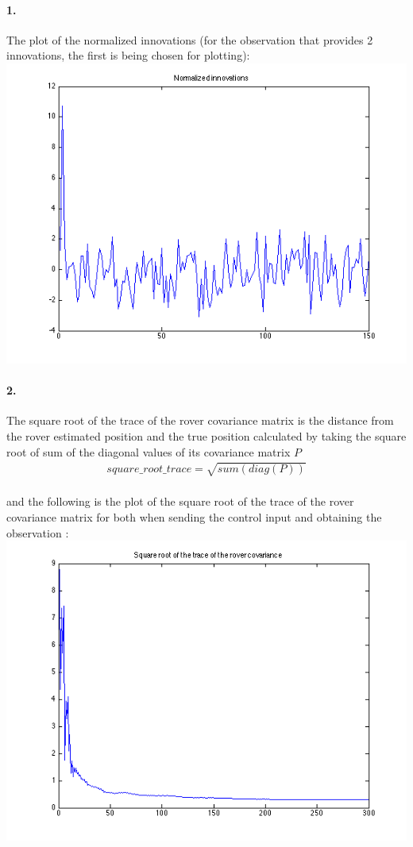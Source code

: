 \documentclass[a4paper]{article}
\begin{document}
\paragraph{1. } The plot of the normalized innovations (for the observation that provides 2 innovations, the first is being chosen for plotting):\\
\includegraphics[scale=.70]{normalized_innovations.png}

\paragraph{2. } The square root of the trace of the rover covariance matrix is the distance from the rover estimated position and the true position calculated by taking the square root of sum of the diagonal values of its covariance matrix $P$
\begin{align*}
square\_root\_trace = \sqrt{sum(diag(P))}
\end{align*}\\
and the following is the plot of the square root of the trace of the rover covariance matrix for both when sending the control input and obtaining the observation : \\
\includegraphics[scale=.7]{sqrt_traces.png}
\end{document}
